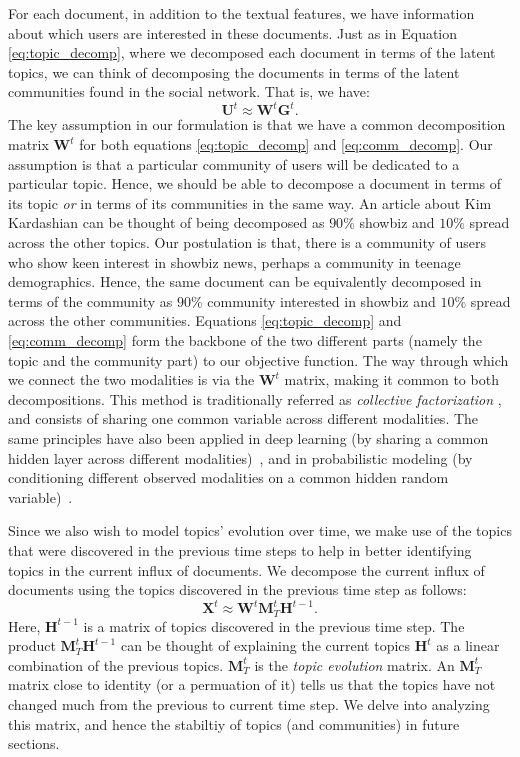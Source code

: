 For each document, in addition to the textual features, we have information about which users
are interested in these documents.  Just as in Equation \ref{eq:topic_decomp}, where we decomposed
each document in terms of the latent topics, we can think of decomposing the documents in terms of the
latent communities found in the social network.  That is, we have:
\begin{equation}
	\mathbf{U}^t \approx \mathbf{W}^t\mathbf{G}^t. \label{eq:comm_decomp}
\end{equation}
The key assumption in our formulation is that we have a common decomposition matrix $\mathbf{W}^t$ for
both equations \ref{eq:topic_decomp} and \ref{eq:comm_decomp}.  Our assumption is that a 
particular community of users will be dedicated to a particular topic.  Hence, we should be able to
decompose a document in terms of its topic \emph{or} in terms of its communities in the same way. An article
about Kim Kardashian can be thought of being decomposed as $90\%$ showbiz and $10\%$ spread across the other
topics.  Our postulation is that, there is a community of users who show keen interest in showbiz news, perhaps
a community in teenage demographics.  Hence, the same document can be equivalently decomposed in terms of 
the community as $90\%$ community interested in showbiz and $10\%$ spread across the other communities.
Equations \ref{eq:topic_decomp} and \ref{eq:comm_decomp} form the backbone of the two different parts
(namely the topic and the community part) to our objective function.  The way through which we connect
the two modalities is via the $\mathbf{W}^t$ matrix, making it common to both decompositions. 
This method is traditionally referred as \emph{collective factorization}  \cite{singh:2008}, and consists of sharing one common variable across different modalities.
The same principles have also been applied in deep learning 
(by sharing a common hidden layer across different modalities)~\cite{ngiam2011multimodal}, 
and in probabilistic modeling 
(by conditioning different observed modalities on a common hidden random variable)~\cite{Blei:2003}. 

Since we also wish to model topics' evolution over time, we make use of the topics that were
discovered in the previous time steps to help in better identifying topics
in the current influx of documents.  We decompose the current influx of documents using the topics discovered
in the previous time step as follows:
\begin{equation}
\mathbf{X}^t \approx \mathbf{W}^t\mathbf{M}_T^t\mathbf{H}^{t-1}. \label{eq:prev_topic_decomp}
\end{equation}
Here, $\mathbf{H}^{t-1}$ is a matrix of topics discovered in the previous time step.  The product
$\mathbf{M}_T^t\mathbf{H}^{t-1}$ can be thought of explaining the current topics $\mathbf{H}^t$ 
as a linear combination of the previous topics.  $\mathbf{M}_T^t$ is the \emph{topic evolution} matrix.
An $\mathbf{M}_T^{t}$ matrix close to identity (or a permuation of it) tells us that the topics have not changed 
much from the previous to current time step.  We delve into analyzing this matrix, and hence
the stabiltiy of topics (and communities) in future sections.

